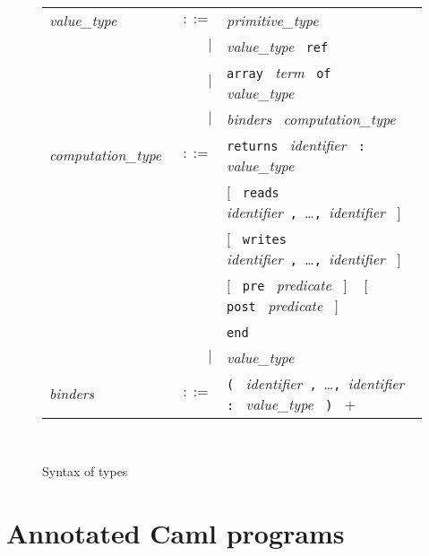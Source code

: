 \documentclass[12pt]{report}
\newcommand{\te}[1]{\texttt{#1}~}
\newcommand{\nt}[1]{\textsl{#1}~}
\begin{document}
\begin{figure}[htbp]
\begin{center}
\hrulefill\\
\begin{tabular}{lrl}
  \nt{value\_type}
    & $::=$ & \nt{primitive\_type} \\
      & $|$ & \nt{value\_type} \te{ref} \\
      & $|$ & \te{array} \nt{term} \te{of} \nt{value\_type} \\
      & $|$ & \nt{binders} \nt{computation\_type} 
  \\[0.1em]

  \nt{computation\_type}
    & $::=$ & \te{returns} \nt{identifier} \te{:} \nt{value\_type} \\
      &     & $[$~ \te{reads} 
                   \nt{identifier}\te{,}\ldots\te{,}\nt{identifier} $]$~ \\
      &     & $[$~ \te{writes} 
                   \nt{identifier}\te{,}\ldots\te{,}\nt{identifier} $]$~ \\
      &     & $[$~ \te{pre} \nt{predicate} $]$ ~ 
              $[$~ \te{post} \nt{predicate} $]$ \\
      &     & \te{end} \\
      & $|$ & \nt{value\_type}
  \\[0.1em]

  \nt{binders}
    & $::=$ & \te{(} \nt{identifier}\te{,}\dots\te{,}\nt{identifier}  \te{:}
              \nt{value\_type}  \te{)} $+$ \\
\end{tabular}\\
\hrulefill
\caption{Syntax of types}
\label{fig:types}
\end{center}		
\end{figure}

\section{Annotated Caml programs}
\end{document}
